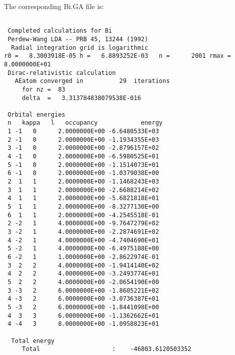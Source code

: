 \documentclass[11pt]{article}
\begin{document}
The corresponding Bi.GA file is:

\begin{verbatim}
 
 Completed calculations for Bi
 Perdew-Wang LDA -- PRB 45, 13244 (1992)
  Radial integration grid is logarithmic 
r0 =   8.3003918E-05 h =   6.8893252E-03   n =      2001 rmax =   8.0000000E+01
 Dirac-relativistic calculation
   AEatom converged in          29  iterations
     for nz =  83
     delta  =   3.313784838079538E-016
 
 Orbital energies
 n   kappa   l   occupancy            energy
 1 -1   0      2.0000000E+00 -6.6480533E+03
 2 -1   0      2.0000000E+00 -1.1934355E+03
 3 -1   0      2.0000000E+00 -2.8796157E+02
 4 -1   0      2.0000000E+00 -6.5980525E+01
 5 -1   0      2.0000000E+00 -1.1514073E+01
 6 -1   0      2.0000000E+00 -1.0379038E+00
 2  1   1      2.0000000E+00 -1.1468243E+03
 3  1   1      2.0000000E+00 -2.6688214E+02
 4  1   1      2.0000000E+00 -5.6821818E+01
 5  1   1      2.0000000E+00 -8.3277130E+00
 6  1   1      2.0000000E+00 -4.2545518E-01
 2 -2   1      4.0000000E+00 -9.7647279E+02
 3 -2   1      4.0000000E+00 -2.2874691E+02
 4 -2   1      4.0000000E+00 -4.7404690E+01
 5 -2   1      4.0000000E+00 -6.4975188E+00
 6 -2   1      1.0000000E+00 -2.8622974E-01
 3  2   2      4.0000000E+00 -1.9414140E+02
 4  2   2      4.0000000E+00 -3.2493774E+01
 5  2   2      4.0000000E+00 -2.0654190E+00
 3 -3   2      6.0000000E+00 -1.8605221E+02
 4 -3   2      6.0000000E+00 -3.0736387E+01
 5 -3   2      6.0000000E+00 -1.8441098E+00
 4  3   3      6.0000000E+00 -1.1362662E+01
 4 -4   3      8.0000000E+00 -1.0958823E+01
 
  Total energy
     Total                    :    -46803.6120503352     
\end{verbatim}





\newcommand{\bibdir}{../../../../bibfiles/}


\end{document}
